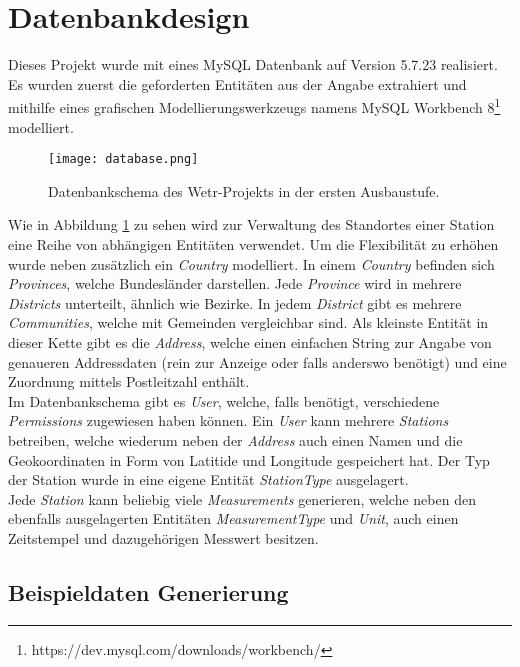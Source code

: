 \section{Datenbankdesign}

Dieses Projekt wurde mit eines MySQL Datenbank auf Version 5.7.23 realisiert. Es wurden zuerst die geforderten Entitäten aus der Angabe extrahiert und mithilfe eines grafischen Modellierungswerkzeugs namens MySQL Workbench 8\footnote{https://dev.mysql.com/downloads/workbench/} modelliert.

\begin{figure}[H]
\centering
\texttt{[image: database.png]}
\caption{Datenbankschema des Wetr-Projekts in der ersten Ausbaustufe.}
\label{fig:db}
\end{figure}
\raggedright
Wie in Abbildung \ref{fig:db} zu sehen wird zur Verwaltung des Standortes einer Station eine Reihe von abhängigen Entitäten verwendet. Um die Flexibilität zu erhöhen wurde neben zusätzlich ein \textit{Country} modelliert. In einem \textit{Country} befinden sich \textit{Provinces}, welche Bundesländer darstellen. Jede \textit{Province} wird in mehrere \textit{Districts} unterteilt, ähnlich wie Bezirke. In jedem \textit{District} gibt es mehrere \textit{Communities}, welche mit Gemeinden vergleichbar sind. Als kleinste Entität in dieser Kette gibt es die \textit{Address}, welche einen einfachen String zur Angabe von genaueren Addressdaten (rein zur Anzeige oder falls anderswo benötigt) und eine Zuordnung mittels Postleitzahl enthält.\\
Im Datenbankschema gibt es \textit{User}, welche, falls benötigt, verschiedene \textit{Permissions} zugewiesen haben können. Ein \textit{User} kann mehrere \textit{Stations} betreiben, welche wiederum neben der \textit{Address} auch einen Namen und die Geokoordinaten in Form von Latitide und Longitude gespeichert hat. Der Typ der Station wurde in eine eigene Entität \textit{StationType} ausgelagert.\\
Jede \textit{Station} kann beliebig viele \textit{Measurements} generieren, welche neben den ebenfalls ausgelagerten Entitäten \textit{MeasurementType} und \textit{Unit}, auch einen Zeitstempel und dazugehörigen Messwert besitzen.\\

\subsection{Beispieldaten Generierung}

